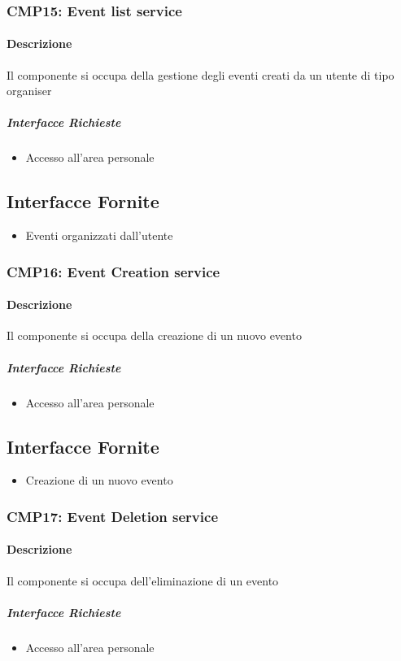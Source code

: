 \documentclass[9pt]{extarticle}
\begin{document}
\subsubsection*{CMP15: Event list service}
\paragraph{Descrizione}
Il componente si occupa della gestione degli eventi creati da un utente di tipo organiser
\subparagraph{Interfacce Richieste}
\begin{itemize}
	\item Accesso all'area personale
\end{itemize}
\subsection{Interfacce Fornite}
\begin{itemize}
	\item Eventi organizzati dall'utente
\end{itemize}

\subsubsection*{CMP16: Event Creation service}
\paragraph{Descrizione}
Il componente si occupa della creazione di un nuovo evento
\subparagraph{Interfacce Richieste}
\begin{itemize}
	\item Accesso all'area personale
\end{itemize}
\subsection{Interfacce Fornite}
\begin{itemize}
	\item Creazione di un nuovo evento
\end{itemize}

\subsubsection*{CMP17: Event Deletion service}
\paragraph{Descrizione}
Il componente si occupa dell'eliminazione di un evento
\subparagraph{Interfacce Richieste}
\begin{itemize}
	\item Accesso all'area personale
\end{itemize}
\end{document}
